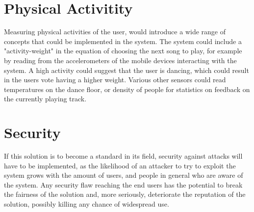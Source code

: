 \section{Physical Activitity}
Measuring physical activities of the user, would introduce a wide
range of concepts that could be implemented in the system. The system
could include a "activity-weight" in the equation of choosing the next
song to play, for example by reading from the accelerometers of the
mobile devices interacting with the system. A high activity could
suggest that the user is dancing, which could result in the users vote
having a higher weight. Various other sensors could read temperatures
on the dance floor, or density of people for statistics on feedback
on the currently playing track.

\section{Security}
If this solution is to become a standard in its field, security against attacks will have to be implemented, as the likelihood of an attacker to try to exploit the system grows with the amount of users, and people in general who are aware of the system. Any security flaw reaching the end users has the potential to break the fairness of the solution and, more seriously, deteriorate the reputation of the solution, possibly killing any chance of widespread use.
